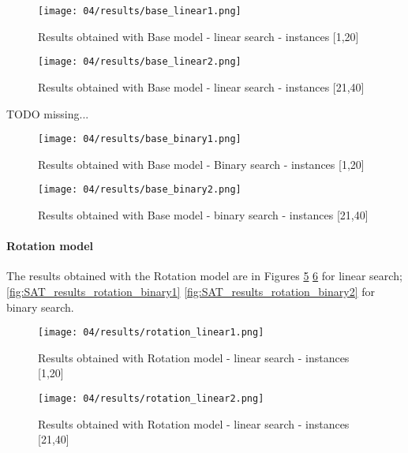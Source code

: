   \begin{figure}[H]
    \centering
    \texttt{[image: 04/results/base\_linear1.png]}
    \caption{
      Results obtained with Base model - linear search - instances [1,20]
    }
    \label{fig:SAT_results_base_linear1}
  \end{figure}
  \begin{figure}[H]
    \centering
    \texttt{[image: 04/results/base\_linear2.png]}
    \caption{
      Results obtained with Base model - linear search - instances [21,40]
    }
    \label{fig:SAT_results_base_linear2}
  \end{figure}    

  \colorbox{BurntOrange}{TODO missing...} 
  \begin{figure}[H]
    \centering
    \texttt{[image: 04/results/base\_binary1.png]}
    \caption{
      Results obtained with Base model - Binary search - instances [1,20]
    }
    \label{fig:SAT_results_base_binary1}
  \end{figure}
  \begin{figure}[H]
    \centering
    \texttt{[image: 04/results/base\_binary2.png]}
    \caption{
      Results obtained with Base model - binary search - instances [21,40]
    }
    \label{fig:SAT_results_base_binary2}
  \end{figure} 
  

  \paragraph{Rotation model}
  The results obtained with the Rotation model are in Figures \ref{fig:SAT_results_rotation_linear1} \ref{fig:SAT_results_rotation_linear2}
  for linear search; \ref{fig:SAT_results_rotation_binary1} \ref{fig:SAT_results_rotation_binary2} for binary search.
  
  \begin{figure}[H]
    \centering
    \texttt{[image: 04/results/rotation\_linear1.png]}
    \caption{
      Results obtained with Rotation model - linear search - instances [1,20]
    }
    \label{fig:SAT_results_rotation_linear1}
  \end{figure}

  \begin{figure}[H]
    \centering
    \texttt{[image: 04/results/rotation\_linear2.png]}
    \caption{
      Results obtained with Rotation model - linear search - instances [21,40]
    }
    \label{fig:SAT_results_rotation_linear2}
  \end{figure}    

